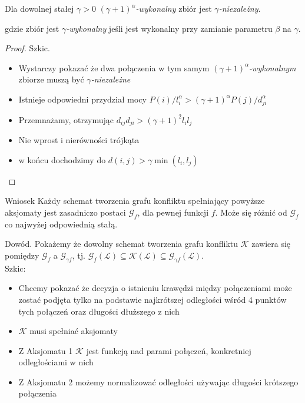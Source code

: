 \documentclass[polish, t,10pt]{beamer}
\begin{document}
    \begin{frame}
        \begin{theorem}[1]
            Dla dowolnej stałej $\gamma > 0$ \textit{$(\gamma + 1)^{\alpha}$-wykonalny} zbiór jest \textit{$\gamma$-niezależny}.
        \end{theorem}
        gdzie zbiór jest \textit{$\gamma$-wykonalny} jeśli jest wykonalny przy zamianie parametru $\beta$ na $\gamma$. \\
        \begin{proof}
            Szkic. \\
            \begin{itemize}
                \item Wystarczy pokazać że dwa połączenia w tym samym \textit{$(\gamma + 1)^{\alpha}$-wykonalnym} zbiorze muszą być \textit{$\gamma$-niezależne}
                \item Istnieje odpowiedni przydział mocy $P(i)/l_i^{\alpha} > (\gamma + 1)^{\alpha}P(j)/d_{ji}^{\alpha}$
                \item Przemnażamy, otrzymując $d_{ij}d_{ji} > (\gamma + 1)^2l_i l_j$
                \item Nie wprost i nierówności trójkąta
                \item w końcu dochodzimy do $d(i,j) > \gamma\min(l_i,l_j)$
            \end{itemize}
        \end{proof}
    \end{frame}
    \begin{frame}
        \begin{block}{Wniosek}
            Każdy schemat tworzenia grafu konfliktu spełniający powyższe aksjomaty jest zasadniczo postaci $\mathcal{G}_f$, dla pewnej funkcji $f$. Może się różnić od $\mathcal{G}_f$ co najwyżej odpowiednią stałą.
        \end{block}

        \begin{block}{Dowód.}
            Pokażemy że dowolny schemat tworzenia grafu konfliktu $\mathcal{K}$ zawiera się pomiędzy $\mathcal{G}_f$ a $\mathcal{G}_{\gamma f}$, tj. $\mathcal{G}_f(\mathcal{L}) \subseteq \mathcal{K}(\mathcal{L}) \subseteq \mathcal{G}_{\gamma f}(\mathcal{L})$. \\
            Szkic: \\
            \begin{itemize}
                \item Chcemy pokazać że decyzja o istnieniu krawędzi między połączeniami może zostać podjęta tylko na podstawie najkrótszej odległości wśród 4 punktów tych połączeń oraz długości dłuższego z nich
                \item $\mathcal{K}$ musi spełniać aksjomaty
                \item Z Aksjomatu 1 $\mathcal{K}$ jest funkcją nad parami połączeń, konkretniej odległościami w nich
                \item Z Aksjomatu 2 możemy normalizować odległości używając długości krótszego połączenia
            \end{itemize}
        \end{block}
    \end{frame}
\end{document}
